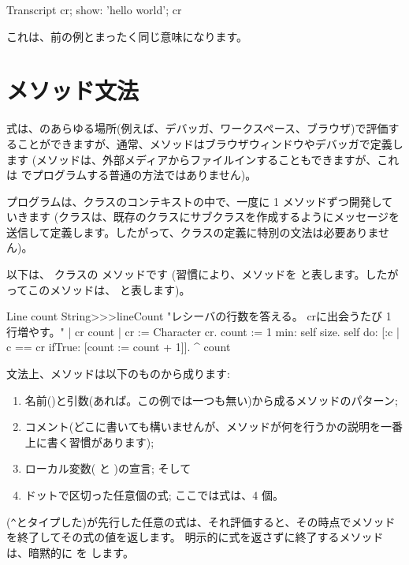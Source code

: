 \documentclass[a4paper,10pt,twoside]{book}
\begin{document}
\begin{code}{}
Transcript cr;
    show: 'hello world';
    cr
\end{code}
これは、前の例とまったく同じ意味になります。

\section{メソッド文法}

式は、\pharo のあらゆる場所(例えば、デバッガ、ワークスペース、ブラウザ)で評価することができますが、通常、メソッドはブラウザウィンドウやデバッガで定義します
(メソッドは、外部メディアからファイルインすることもできますが、これは \pharo でプログラムする普通の方法ではありません)。

プログラムは、クラスのコンテキストの中で、一度に 1 メソッドずつ開発していきます
(クラスは、既存のクラスにサブクラスを作成するようにメッセージを送信して定義します。したがって、クラスの定義に特別の文法は必要ありません)。

以下は、 クラスの  メソッドです
(習慣により、メソッドを  と表します。したがってこのメソッドは、 と表します)。

\begin{method}[lineCount]{Line count}
String>>>lineCount
   "レシーバの行数を答える。
   crに出会うたび 1 行増やす。"
   | cr count |
   cr := Character cr.
   count := 1 min: self size.
   self do:
      [:c | c == cr ifTrue: [count := count + 1]].
   ^ count
\end{method}

文法上、メソッドは以下のものから成ります:
\begin{enumerate}
  \item 名前(\ie {})と引数(あれば。この例では一つも無い)から成るメソッドのパターン;
  \item コメント(どこに書いても構いませんが、メソッドが何を行うかの説明を一番上に書く習慣があります);
  \item ローカル変数(\ie {} と )の宣言; そして
  \item ドットで区切った任意個の式; ここでは式は、4 個。
\end{enumerate}

\ct{^}(\verb|^|とタイプした)が先行した任意の式は、それ評価すると、その時点でメソッドを終了してその式の値を返します。
明示的に式を返さずに終了するメソッドは、暗黙的に  を します。
\end{document}
